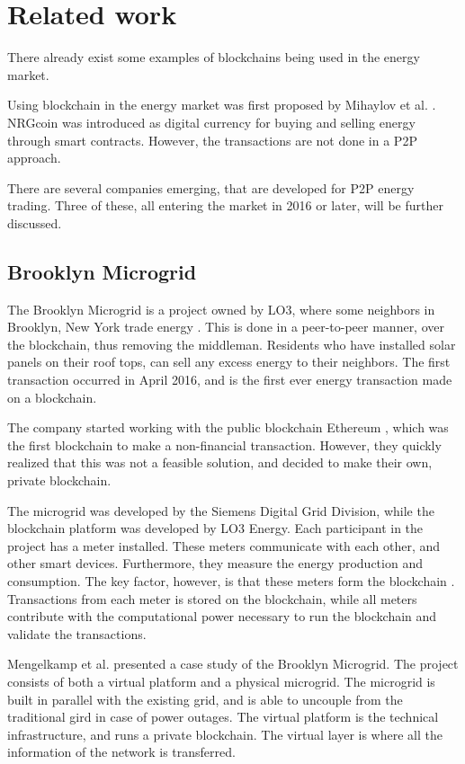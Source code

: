 \chapter{Related work}\label{related}
There already exist some examples of blockchains being used in the energy market.  

Using blockchain in the energy market was first proposed by Mihaylov et al. \cite{NRGcoin_Mihaylov}. NRGcoin was introduced as digital currency for buying and selling energy through smart contracts. However, the transactions are not done in a P2P approach. 
 
There are several companies emerging, that are developed for P2P energy trading. Three of these, all entering the market in 2016 or later, will be further discussed. 


\section{Brooklyn Microgrid} \label{Brooklyn}
The Brooklyn Microgrid is a project owned by LO3, where some neighbors in Brooklyn, New York trade energy  \cite{bm101}. This is done in a peer-to-peer manner, over the blockchain, thus removing the middleman. Residents who have installed solar panels on their roof tops, can sell any excess energy to their neighbors. The first transaction occurred in April 2016, and is \cite{exergy, motherboard_bm} the first ever energy transaction made on a blockchain. 

The company started working with the public blockchain Ethereum \cite{medium_bm, motherboard_bm}, which was the first blockchain to make a non-financial transaction. However, they quickly realized that this was not a feasible solution, and decided to make their own, private blockchain.

The microgrid was developed by the Siemens Digital Grid Division, while the blockchain platform was developed by LO3 Energy. 
Each participant in the project has a meter installed. These meters communicate with each other, and other smart devices. Furthermore, they measure the energy production and consumption. The key factor, however, is that these meters form the blockchain \cite{medium_bm, hbr_grid}. Transactions from each meter is stored on the blockchain, while all meters contribute with the computational power necessary to run the blockchain and validate the transactions. 

Mengelkamp et al. \cite{Brooklyn_Mengelkamp} presented a case study of the Brooklyn Microgrid. The project consists of both a virtual platform and a physical microgrid. The microgrid is built in parallel with the existing grid, and is able to uncouple from the traditional gird in case of power outages. The virtual platform is the technical infrastructure, and runs a private blockchain. The virtual layer is where all the information of the network is transferred. 

